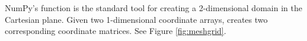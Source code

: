 NumPy's  function is the standard tool for creating a 2-dimensional domain in the Cartesian plane.
Given two 1-dimensional coordinate arrays,  creates two corresponding coordinate matrices.
See Figure \ref{fig:meshgrid}.

\begin{figure}[H] %
%
%
%
%
%


\end{figure}
